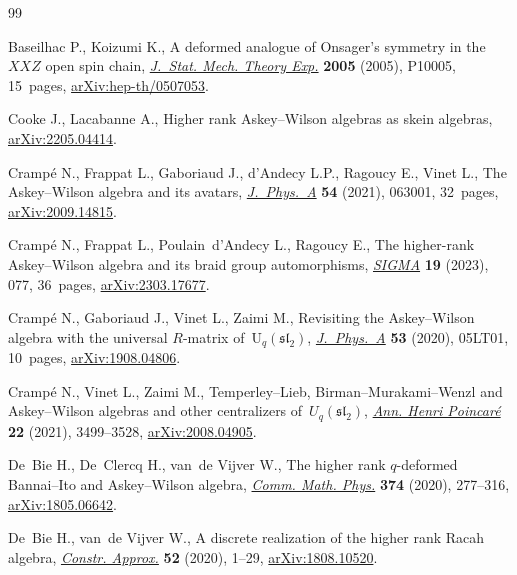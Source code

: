 \begin{thebibliography}{99}
\footnotesize\itemsep=0pt

Baseilhac P., Koizumi K., A deformed analogue of {O}nsager's symmetry in
 the~{$XXZ$} open spin chain, \href{https://doi.org/10.1088/1742-5468/2005/10/p10005}{\textit{J.~Stat. Mech. Theory Exp.}}
 \textbf{2005} (2005), P10005, 15~pages, \href{https://arxiv.org/abs/hep-th/0507053}{arXiv:hep-th/0507053}.

Cooke J., Lacabanne A., Higher rank {A}skey--{W}ilson algebras as skein
 algebras, \href{https://arxiv.org/abs/2205.04414}{arXiv:2205.04414}.

Cramp\'e N., Frappat L., Gaboriaud J., d'Andecy L.P., Ragoucy E., Vinet L., The
 {A}skey--{W}ilson algebra and its avatars, \href{https://doi.org/10.1088/1751-8121/abd783}{\textit{J.~Phys.~A}} \textbf{54}
 (2021), 063001, 32~pages, \href{https://arxiv.org/abs/2009.14815}{arXiv:2009.14815}.

Cramp\'e N., Frappat L., Poulain~d'Andecy L., Ragoucy E., The higher-rank
 {A}skey--{W}ilson algebra and its braid group automorphisms, \href{https://doi.org/10.3842/SIGMA.2023.077}{\textit{SIGMA}}
 \textbf{19} (2023), 077, 36~pages, \href{https://arxiv.org/abs/2303.17677}{arXiv:2303.17677}.

Cramp\'e N., Gaboriaud J., Vinet L., Zaimi M., Revisiting the {A}skey--{W}ilson
 algebra with the universal {$R$}-matrix of~{$\mathrm{U}_q(\mathfrak{sl}_2)$},
 \href{https://doi.org/10.1088/1751-8121/ab604e}{\textit{J.~Phys.~A}} \textbf{53} (2020), 05LT01, 10~pages,
 \href{https://arxiv.org/abs/1908.04806}{arXiv:1908.04806}.

Cramp\'e N., Vinet L., Zaimi M., Temperley--{L}ieb,
 {B}irman--{M}urakami--{W}enzl and {A}skey--{W}ilson algebras and other
 centralizers of~{$U_q(\mathfrak{sl}_2)$}, \href{https://doi.org/10.1007/s00023-021-01064-x}{\textit{Ann. Henri Poincar\'e}}
 \textbf{22} (2021), 3499--3528, \href{https://arxiv.org/abs/2008.04905}{arXiv:2008.04905}.

De~Bie H., De~Clercq H., van~de Vijver W., The higher rank {$q$}-deformed
 {B}annai--{I}to and {A}skey--{W}ilson algebra, \href{https://doi.org/10.1007/s00220-019-03562-w}{\textit{Comm. Math. Phys.}}
 \textbf{374} (2020), 277--316, \href{https://arxiv.org/abs/1805.06642}{arXiv:1805.06642}.

De~Bie H., van~de Vijver W., A discrete realization of the higher rank {R}acah
 algebra, \href{https://doi.org/10.1007/s00365-019-09475-0}{\textit{Constr. Approx.}} \textbf{52} (2020), 1--29,
 \href{https://arxiv.org/abs/1808.10520}{arXiv:1808.10520}.


\end{thebibliography}

